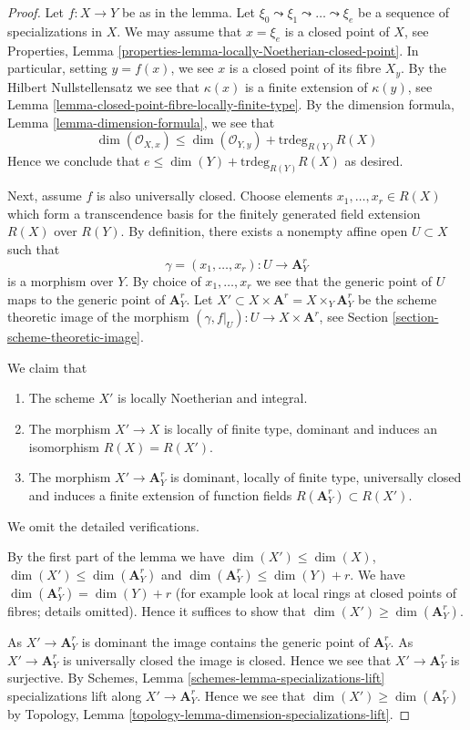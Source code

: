 \begin{proof}
Let $f : X \to Y$ be as in the lemma.
Let $\xi_0 \leadsto \xi_1 \leadsto \ldots \leadsto \xi_e$ be
a sequence of specializations in $X$. We may assume that $x = \xi_e$
is a closed point of $X$, see
Properties, Lemma \ref{properties-lemma-locally-Noetherian-closed-point}.
In particular, setting $y = f(x)$, we see $x$ is a closed point of its fibre
$X_y$. By the Hilbert Nullstellensatz we see that $\kappa(x)$ is a finite
extension of $\kappa(y)$, see
Lemma \ref{lemma-closed-point-fibre-locally-finite-type}.
By the dimension formula, Lemma \ref{lemma-dimension-formula},
we see that
$$
\dim(\mathcal{O}_{X, x}) \leq \dim(\mathcal{O}_{Y, y}) +
\text{trdeg}_{R(Y)} R(X)
$$
Hence we conclude that $e \leq \dim(Y) + \text{trdeg}_{R(Y)} R(X)$ as desired.

\medskip\noindent
Next, assume $f$ is also universally closed. Choose elements
$x_1, \ldots, x_r \in R(X)$ which form a transcendence basis for
the finitely generated field extension $R(X)$ over $R(Y)$.
By definition, there exists a nonempty affine open $U \subset X$ such
that
$$
\gamma = (x_1, \ldots, x_r) : U \longrightarrow \mathbf{A}^r_Y
$$
is a morphism over $Y$. By choice of $x_1, \ldots, x_r$ we see that
the generic point of $U$ maps to the generic point of $\mathbf{A}^r_Y$.
Let $X' \subset X \times \mathbf{A}^r = X \times_Y \mathbf{A}^r_Y$
be the scheme theoretic image of the morphism
$(\gamma, f|_U) : U \to X \times \mathbf{A}^r$, see
Section \ref{section-scheme-theoretic-image}.

\medskip\noindent
We claim that
\begin{enumerate}
\item The scheme $X'$ is locally Noetherian and integral.
\item The morphism $X' \to X$ is locally of finite type,
dominant and induces an isomorphism $R(X) = R(X')$.
\item The morphism $X' \to \mathbf{A}^r_Y$ is dominant,
locally of finite type, universally closed and induces a finite extension
of function fields $R(\mathbf{A}^r_Y) \subset R(X')$.
\end{enumerate}
We omit the detailed verifications.

\medskip\noindent
By the first part of the lemma we have
$\dim(X') \leq \dim(X)$,
$\dim(X') \leq \dim(\mathbf{A}^r_Y)$
and
$\dim(\mathbf{A}^r_Y) \leq \dim(Y) + r$.
We have $\dim(\mathbf{A}^r_Y) = \dim(Y) + r$
(for example look at local rings at closed points of fibres;
details omitted).
Hence it suffices to show that $\dim(X') \geq \dim(\mathbf{A}^r_Y)$.

\medskip\noindent
As $X' \to \mathbf{A}^r_Y$ is dominant the image contains
the generic point of $\mathbf{A}^r_Y$.
As $X' \to \mathbf{A}^r_Y$ is universally closed the image is closed.
Hence we see that $X' \to \mathbf{A}^r_Y$ is surjective.
By Schemes, Lemma \ref{schemes-lemma-specializations-lift}
specializations lift along $X' \to \mathbf{A}^r_Y$.
Hence we see that $\dim(X') \geq \dim(\mathbf{A}^r_Y)$ by
Topology, Lemma \ref{topology-lemma-dimension-specializations-lift}.
\end{proof}

